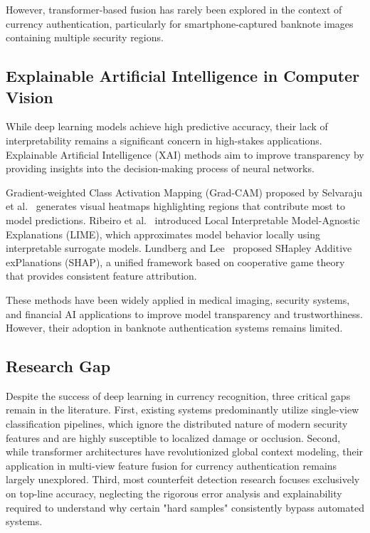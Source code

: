 \documentclass[preprint,12pt,authoryear]{elsarticle}
\begin{document}
However, transformer-based fusion has rarely been explored in the context of currency authentication, particularly for smartphone-captured banknote images containing multiple security regions.

\subsection{Explainable Artificial Intelligence in Computer Vision}

While deep learning models achieve high predictive accuracy, their lack of interpretability remains a significant concern in high-stakes applications. Explainable Artificial Intelligence (XAI) methods aim to improve transparency by providing insights into the decision-making process of neural networks.

Gradient-weighted Class Activation Mapping (Grad-CAM) proposed by Selvaraju et al.~\cite{selvaraju2017gradcam} generates visual heatmaps highlighting regions that contribute most to model predictions. Ribeiro et al.~\cite{ribeiro2016lime} introduced Local Interpretable Model-Agnostic Explanations (LIME), which approximates model behavior locally using interpretable surrogate models. Lundberg and Lee~\cite{lundberg2017shap} proposed SHapley Additive exPlanations (SHAP), a unified framework based on cooperative game theory that provides consistent feature attribution.

These methods have been widely applied in medical imaging, security systems, and financial AI applications to improve model transparency and trustworthiness. However, their adoption in banknote authentication systems remains limited.

\subsection{Research Gap}

Despite the success of deep learning in currency recognition, three critical gaps remain in the literature. First, existing systems predominantly utilize single-view classification pipelines, which ignore the distributed nature of modern security features and are highly susceptible to localized damage or occlusion. Second, while transformer architectures have revolutionized global context modeling, their application in multi-view feature fusion for currency authentication remains largely unexplored. Third, most counterfeit detection research focuses exclusively on top-line accuracy, neglecting the rigorous error analysis and explainability required to understand why certain "hard samples" consistently bypass automated systems.
\end{document}
